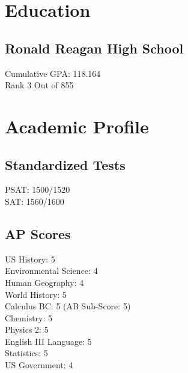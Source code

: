 \documentclass[letterpaper]{kathy-resume} %
\begin{document}





\begin{minipage}[t]{0.35\textwidth} %


\section{Education} 

\subsection{Ronald Reagan High School}

Cumulative GPA: 118.164 \\
Rank 3 Out of 855


\sectionspace %


\section{Academic Profile} 
\subsection{Standardized Tests}
PSAT: 1500/1520 \\
SAT: 1560/1600 \\ 
\sectionspace %

\subsection{AP Scores}
US History: 5 \\ 
Environmental Science: 4 \\
Human Geography: 4 \\
World History: 5 \\ 
Calculus BC: 5 (AB Sub-Score: 5) \\ 
Chemistry: 5 \\
Physics 2: 5 \\
English III Language: 5 \\
Statistics: 5 \\
US Government: 4


\end{minipage}
\end{document}
